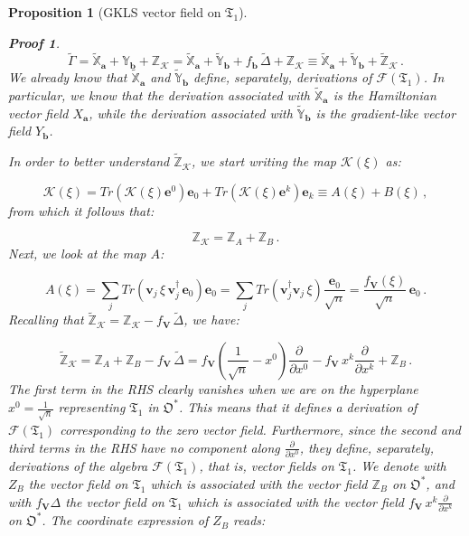 \documentclass[11pt]{article}
\newcommand{\be}{\begin{equation}}
\newcommand{\ee}{\end{equation}}
\newcommand{\obsp}{\mathfrak{O}}
\newtheorem{prop}{Proposition}
\newtheorem*{pf}{Proof}
\begin{document}
\begin{prop}[GKLS vector field on $\mathfrak{T}_{1}$]
\begin{pf}
\be\label{eqn: useful decomposition of GKLS on the self-adjoint part of the dual of the algebra}
\widetilde{\Gamma}= \widetilde{\mathbb{X}}_{\mathbf{a}} + \mathbb{Y}_{\mathbf{b}} + \mathbb{Z}_{\mathcal{K}}=\widetilde{\mathbb{X}}_{\mathbf{a}}  + \widetilde{\mathbb{Y}}_{\mathbf{b}} +  f_{\mathbf{b}} \,\widetilde{\Delta} + \mathbb{Z}_{\mathcal{K}}\equiv \widetilde{\mathbb{X}}_{\mathbf{a}}  + \widetilde{\mathbb{Y}}_{\mathbf{b}} +  \widetilde{\mathbb{Z}}_{\mathcal{K}}\,.
\ee
We already know that $\widetilde{\mathbb{X}}_{\mathbf{a}}$ and $\widetilde{\mathbb{Y}}_{\mathbf{b}}$ define, separately, derivations of $\mathcal{F}(\mathfrak{T}_{1})$.
In particular, we know that the derivation associated with $\widetilde{\mathbb{X}}_{\mathbf{a}}$ is the Hamiltonian vector field $X_{\mathbf{a}}$, while the derivation associated with  $\widetilde{\mathbb{Y}}_{\mathbf{b}}$ is the gradient-like vector field $Y_{\mathbf{b}}$.



In order to better understand  $\widetilde{\mathbb{Z}}_{\mathcal{K}}$, we start writing the map $\mathcal{K}(\xi)$ as:

\be
\mathcal{K}(\xi)=Tr\left(\mathcal{K}(\xi)\mathbf{e}^{0}\right)\mathbf{e}_{0} + Tr\left(\mathcal{K}(\xi)\mathbf{e}^{k}\right)\mathbf{e}_{k}\equiv A(\xi) + B(\xi)\,,
\ee
from which it follows that:

\be
\mathbb{Z}_{\mathcal{K}}=\mathbb{Z}_{A} + \mathbb{Z}_{B}\,.
\ee
Next, we look at the map $A$:

\be
A(\xi)=\sum_{j} Tr\left(\mathbf{v}_{j}\,\xi\,\mathbf{v}_{j}^{\dagger}\,\mathbf{e}_{0}\right)\mathbf{e}_{0}=\sum_{j} Tr\left(\mathbf{v}_{j}^{\dagger}\mathbf{v}_{j}\,\xi\right)\frac{\mathbf{e}_{0}}{\sqrt{n}}=\frac{f_{\mathbf{V}}(\xi)}{\sqrt{n}}\,\mathbf{e}_{0}\,.
\ee
Recalling that $\widetilde{\mathbb{Z}}_{\mathcal{K}}=\mathbb{Z}_{\mathcal{K}} - f_{\mathbf{V}}\,\widetilde{\Delta}$, we have:

\be
\widetilde{\mathbb{Z}}_{\mathcal{K}}=\mathbb{Z}_{A} + \mathbb{Z}_{B} - f_{\mathbf{V}}\,\widetilde{\Delta}=f_{\mathbf{V}}\left(\frac{1}{\sqrt{n}}-x^{0}\right)\frac{\partial}{\partial x^{0}} - f_{\mathbf{V}}\,x^{k}\frac{\partial}{\partial x^{k}} + \mathbb{Z}_{B}\,.
\ee
The first term in the RHS clearly vanishes when we are on the hyperplane $x^{0}=\frac{1}{\sqrt{n}}$ representing $\mathfrak{T}_{1}$ in $\obsp^{*}$.
This means that it defines a derivation of $\mathcal{F}(\mathfrak{T}_{1})$ corresponding to the zero vector field.
Furthermore, since the second and third terms in the RHS have no component along $\frac{\partial}{\partial x^{0}}$, they define, separately, derivations of the algebra $\mathcal{F}(\mathfrak{T}_{1})$, that is, vector fields on $\mathfrak{T}_{1}$.
We denote with $Z_{B}$ the vector field on $\mathfrak{T}_{1}$ which is associated with  the vector field  $\mathbb{Z}_{B}$ on $\obsp^{*}$, and with $f_{\mathbf{V}}  \Delta$ the vector field on $\mathfrak{T}_{1}$ which is associated with  the vector field  $f_{\mathbf{V}}\,x^{k}\frac{\partial}{\partial x^{k}}$ on $\obsp^{*}$.
The coordinate expression of $Z_{B}$ reads:


\end{pf}
\end{prop}
\end{document}

